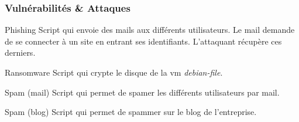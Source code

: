 \documentclass{beamer}
\begin{document}
		\begin{frame}
			\frametitle{Vulnérabilités \& Attaques}
			\begin{block}{Phishing}
				Script qui envoie des mails aux différents utilisateurs. Le mail demande de se connecter à un site en entrant ses identifiants. L'attaquant récupère ces derniers.
			\end{block}
			\begin{block}{Ransomware}
				Script qui crypte le disque de la vm \textit{debian-file}.
			\end{block}
			\begin{block}{Spam (mail)}
				Script qui permet de spamer les différents utilisateurs par mail.
			\end{block}
			\begin{block}{Spam (blog)}
				Script qui permet de spammer sur le blog de l'entreprise.
			\end{block}
		\end{frame}
\end{document}
